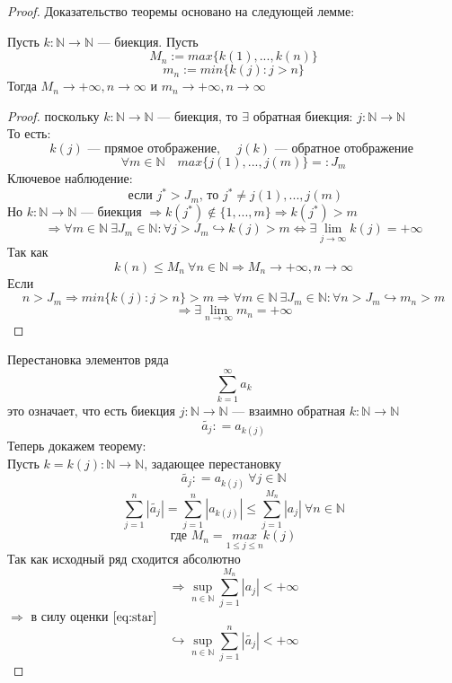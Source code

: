 \documentclass[11pt]{article}
\begin{document}
\begin{proof}
    Доказательство теоремы основано на следующей  лемме:\\
    \begin{lemma}
    Пусть $k: \mathbb{N}\to \mathbb{N}$ --- биекция. Пусть 
    \[ M_n := max \{k(1), ..., k(n) \} \] 
    \[ m_n := min \{k(j): j> n \} \]
    Тогда $M_n\to +\infty , n\to \infty$  и $m_n\to +\infty, n\to \infty$
    \end{lemma} 

    \begin{proof}
    поскольку $k: \mathbb{N}\to \mathbb{N}$ --- биекция, то $\exists$ обратная биекция: $j: \mathbb{N}\to \mathbb{N}$\\
    То есть:
    \[ k(j) \text{ --- прямое отображение,  } \quad j(k) \text{ --- обратное отображение } \]
    \[ \forall m\in \mathbb{N} \quad max\{ j(1), ..., j(m) \} =: J_m \] 
    Ключевое наблюдение:
    \[ \text{ если } j^* > J_m \text{, то } j^* \neq j(1), ... , j(m) \]
    Но $k: \mathbb{N}\to \mathbb{N}$ --- биекция $\Rightarrow k(j^*) \notin \{1, ..., m \} \Rightarrow k(j^*)>m $
    \[ \Rightarrow \forall m\in \mathbb{N} \ \exists J_m \in \mathbb{N} : \forall j> J_m \hookrightarrow k(j) > m \Leftrightarrow \exists \lim\limits_{j\to \infty} k(j) = +\infty \]
    Так как 
    \[ k(n) \le M_n \ \forall n\in \mathbb{N} \Rightarrow M_n\to +\infty, n\to \infty \] 
    Если 
    \[ n>J_m \Rightarrow min\{k(j):j>n \} > m \Rightarrow \forall m\in \mathbb{N} \ \exists J_m\in \mathbb{N}: \forall n>J_m \hookrightarrow m_n> m \]
    \[ \Rightarrow \exists \lim\limits_{n\to \infty} m_n = +\infty \]
    \end{proof} 
    Перестановка элементов ряда 
    \[ \sum_{k=1}^{\infty} a_k \]
    это означает, что есть биекция $j: \mathbb{N}\to \mathbb{N}$ --- взаимно обратная $k:\mathbb{N}\to \mathbb{N}$ 
    \[ \widetilde{a_j} : = a_{k(j)}\] 
    Теперь докажем теорему:\\
    Пусть $k=k(j): \mathbb{N}\to \mathbb{N}$, задающее перестановку
    \[ \widetilde{a_j} : = a_{k(j)} \ \forall j\in \mathbb{N} \]
    \[ \sum_{j=1}^{n} | \widetilde{a_j }| = \sum_{j=1}^{n} | a_{k(j)} | \leq \sum_{j=1}^{M_n} |a_j| \ \forall n\in \mathbb{N} \tag{*}\label{eq:star} \] 
    \[ \text{где } M_n = \underset{1\le j \le n}{max } k(j) \]
    Так как исходный ряд сходится абсолютно
    \[ \Rightarrow \sup_{n\in \mathbb{N}} \sum_{j=1}^{M_n} |a_j| < +\infty \]
    $\Rightarrow$ в силу оценки $\eqref{eq:star}$
    \[ \hookrightarrow \sup_{n\in \mathbb{N}} \sum_{j=1}^{n} | \widetilde{a_j}| < +\infty \]

\end{proof}
\end{document}
